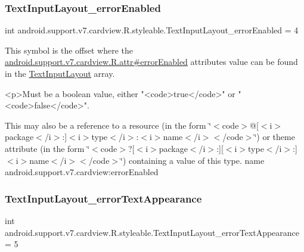 \subsubsection{\texorpdfstring{Text\+Input\+Layout\+\_\+error\+Enabled}{TextInputLayout\_errorEnabled}}
{\footnotesize\ttfamily int android.\+support.\+v7.\+cardview.\+R.\+styleable.\+Text\+Input\+Layout\+\_\+error\+Enabled = 4\hspace{0.3cm}{\ttfamily [static]}}

This symbol is the offset where the \hyperlink{classandroid_1_1support_1_1v7_1_1cardview_1_1R_1_1attr_a5cf4a86d1951bf7c1f69873d84ffdc45}{android.\+support.\+v7.\+cardview.\+R.\+attr\#error\+Enabled} attribute\textquotesingle{}s value can be found in the \hyperlink{classandroid_1_1support_1_1v7_1_1cardview_1_1R_1_1styleable_a9b23c31ffaf354f0f5cc4b82392ef6a4}{Text\+Input\+Layout} array.

\begin{DoxyVerb}      <p>Must be a boolean value, either "<code>true</code>" or "<code>false</code>".
\end{DoxyVerb}
 

This may also be a reference to a resource (in the form \char`\"{}$<$code$>$@\mbox{[}$<$i$>$package$<$/i$>$\+:\mbox{]}$<$i$>$type$<$/i$>$\+:$<$i$>$name$<$/i$>$$<$/code$>$\char`\"{}) or theme attribute (in the form \char`\"{}$<$code$>$?\mbox{[}$<$i$>$package$<$/i$>$\+:\mbox{]}\mbox{[}$<$i$>$type$<$/i$>$\+:\mbox{]}$<$i$>$name$<$/i$>$$<$/code$>$\char`\"{}) containing a value of this type.  name android.\+support.\+v7.\+cardview\+:error\+Enabled \mbox{\label{classandroid_1_1support_1_1v7_1_1cardview_1_1R_1_1styleable_a6a9888ab733b8f3bd68a7bcff9190d87}} 
\subsubsection{\texorpdfstring{Text\+Input\+Layout\+\_\+error\+Text\+Appearance}{TextInputLayout\_errorTextAppearance}}
{\footnotesize\ttfamily int android.\+support.\+v7.\+cardview.\+R.\+styleable.\+Text\+Input\+Layout\+\_\+error\+Text\+Appearance = 5\hspace{0.3cm}{\ttfamily [static]}}

